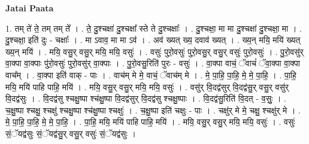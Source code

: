 \documentclass[17pt]{extarticle}
\begin{document}
\textbf{Jatai Paata} \newline

1. तम् ते॑ ते॒ तम् तम् ते᳚ । . ते॒ दु॒श्चक्षा॑ दु॒श्चक्षा᳚ स्ते ते दु॒श्चक्षाः᳚ । . दु॒श्चक्षा॒ मा मा दु॒श्चक्षा॑ दु॒श्चक्षा॒ मा । . दु॒श्चक्षा॒ इति॑ दुः - चक्षाः᳚ । . मा ऽवाव॒ मा मा ऽव॑ । . अव॑ ख्यत् ख्य॒ दवाव॑ ख्यत् । . ख्य॒न् मयि॒ मयि॑ ख्यत् ख्य॒न् मयि॑ । . मयि॒ वसु॒र् वसु॒र् मयि॒ मयि॒ वसुः॑ । . वसुः॑ पुरो॒वसुः॑ पुरो॒वसु॒र् वसु॒र् वसुः॑ पुरो॒वसुः॑ । . पु॒रो॒वसु॑र् वा॒क्पा वा॒क्पाः पु॑रो॒वसुः॑ पुरो॒वसु॑र् वा॒क्पाः । . पु॒रो॒वसु॒रिति॑ पुरः - वसुः॑ । . वा॒क्पा वाचं॒ ॅवाचं॑ ॅवा॒क्पा वा॒क्पा वाच᳚म् । . वा॒क्पा इति॑ वाक् - पाः । . वाच॑म् मे मे॒ वाचं॒ ॅवाच॑म् मे । . मे॒ पा॒हि॒ पा॒हि॒ मे॒ मे॒ पा॒हि॒ । . पा॒हि॒ मयि॒ मयि॑ पाहि पाहि॒ मयि॑ । . मयि॒ वसु॒र् वसु॒र् मयि॒ मयि॒ वसुः॑ । . वसु॑र् वि॒दद्व॑सुर् वि॒दद्व॑सु॒र् वसु॒र् वसु॑र् वि॒दद्व॑सुः । . वि॒दद्व॑सु श्चक्षु॒ष्पा श्च॑क्षु॒ष्पा वि॒दद्व॑सुर् वि॒दद्व॑सु श्चक्षु॒ष्पाः । . वि॒दद्व॑सु॒रिति॑ वि॒दत् - व॒सुः॒ । . च॒क्षु॒ष्पा श्चक्षु॒ श्चक्षु॑ श्चक्षु॒ष्पा श्च॑क्षु॒ष्पा श्चक्षुः॑ । . च॒क्षु॒ष्पा इति॑ चक्षुः - पाः । . चक्षु॑र् मे मे॒ चक्षु॒ श्चक्षु॑र् मे । . मे॒ पा॒हि॒ पा॒हि॒ मे॒ मे॒ पा॒हि॒ । . पा॒हि॒ मयि॒ मयि॑ पाहि पाहि॒ मयि॑ । . मयि॒ वसु॒र् वसु॒र् मयि॒ मयि॒ वसुः॑ । . वसुः॑ सं॒ॅयद्व॑सुः सं॒ॅयद्व॑सु॒र् वसु॒र् वसुः॑ सं॒ॅयद्व॑सुः । \newline
\end{document}
